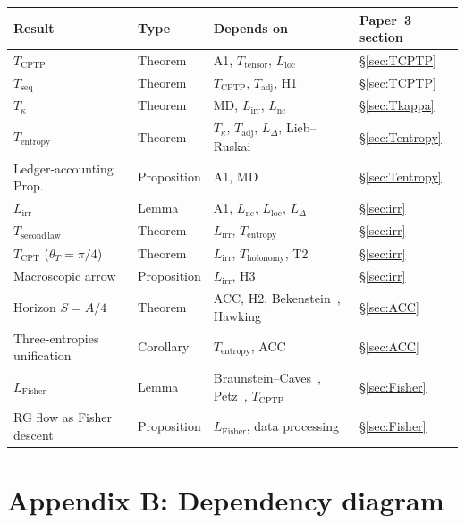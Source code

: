 \documentclass[11pt]{article}
\theoremstyle{remark}
\begin{document}
\begin{center}
\small
\begin{tabular}{llll}
\toprule
\textbf{Result} & \textbf{Type} & \textbf{Depends on} & \textbf{Paper~3 section}\\
\midrule
$T_{\mathrm{CPTP}}$ & Theorem & A1, $T_{\mathrm{tensor}}$, $L_{\mathrm{loc}}$ & \S\ref{sec:TCPTP}\\
$T_{\mathrm{seq}}$ & Theorem & $T_{\mathrm{CPTP}}$, $T_{\mathrm{adj}}$, H1 & \S\ref{sec:TCPTP}\\
$T_\kappa$ & Theorem & MD, $L_{\mathrm{irr}}$, $L_{\mathrm{nc}}$ & \S\ref{sec:Tkappa}\\
$T_{\mathrm{entropy}}$ & Theorem & $T_\kappa$, $T_{\mathrm{adj}}$, $L_\Delta$, Lieb--Ruskai~\cite{LiebRuskai1973} & \S\ref{sec:Tentropy}\\
Ledger-accounting Prop. & Proposition & A1, MD & \S\ref{sec:Tentropy}\\
$L_{\mathrm{irr}}$ & Lemma & A1, $L_{\mathrm{nc}}$, $L_{\mathrm{loc}}$, $L_\Delta$ & \S\ref{sec:irr}\\
$T_{\mathrm{second\,law}}$ & Theorem & $L_{\mathrm{irr}}$, $T_{\mathrm{entropy}}$ & \S\ref{sec:irr}\\
$T_{\mathrm{CPT}}$ ($\theta_T = \pi/4$) & Theorem & $L_{\mathrm{irr}}$, $T_{\mathrm{holonomy}}$, T2 & \S\ref{sec:irr}\\
Macroscopic arrow & Proposition & $L_{\mathrm{irr}}$, H3 & \S\ref{sec:irr}\\
Horizon $S = A/4$ & Theorem & ACC, H2, Bekenstein~\cite{Bekenstein1973}, Hawking~\cite{Hawking1975} & \S\ref{sec:ACC}\\
Three-entropies unification & Corollary & $T_{\mathrm{entropy}}$, ACC & \S\ref{sec:ACC}\\
$L_{\mathrm{Fisher}}$ & Lemma & Braunstein--Caves~\cite{BraunsteinCaves1994}, Petz~\cite{Petz1996}, $T_{\mathrm{CPTP}}$ & \S\ref{sec:Fisher}\\
RG flow as Fisher descent & Proposition & $L_{\mathrm{Fisher}}$, data processing & \S\ref{sec:Fisher}\\
\bottomrule
\end{tabular}
\end{center}


\section*{Appendix B: Dependency diagram}
\label{sec:supp_deps}
\end{document}
